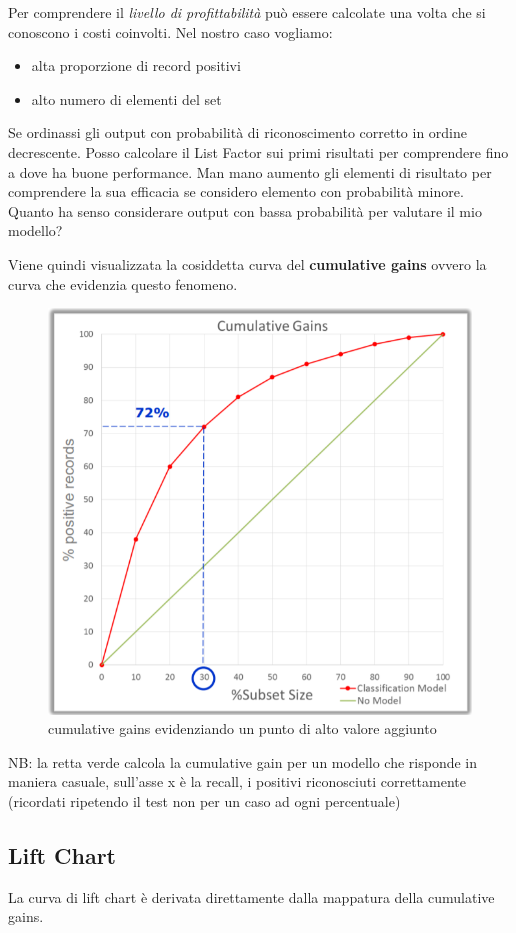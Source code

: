 Per comprendere il \textit{livello di profittabilit\`a} pu\`o essere calcolate una volta che si conoscono i costi coinvolti. Nel nostro caso vogliamo:
\begin{itemize}
	\item alta proporzione di record positivi
	\item alto numero di elementi del set
\end{itemize}

Se ordinassi gli output con probabilit\`a di riconoscimento corretto in ordine decrescente. Posso calcolare il List Factor sui primi risultati per comprendere fino a dove ha buone performance. Man mano aumento gli elementi di risultato per comprendere la sua efficacia se considero elemento con probabilit\`a minore. Quanto ha senso considerare output con bassa probabilit\`a per valutare il mio modello?

Viene quindi visualizzata la cosiddetta curva del \textbf{cumulative gains} ovvero la curva che evidenzia questo fenomeno.
\begin{figure}[h!]
	\centering
	\includegraphics[height=0.6 \linewidth]{classification/pict/cumulative_gains.png}
	\caption{cumulative gains evidenziando un punto di alto valore aggiunto}
\end{figure}

NB: la retta verde calcola la cumulative gain per un modello che risponde in maniera casuale, sull'asse x \`e la recall, i positivi riconosciuti correttamente (ricordati ripetendo il test non per un caso ad ogni percentuale)

\subsection{Lift Chart}
La curva di lift chart \`e derivata direttamente dalla mappatura della cumulative gains.

